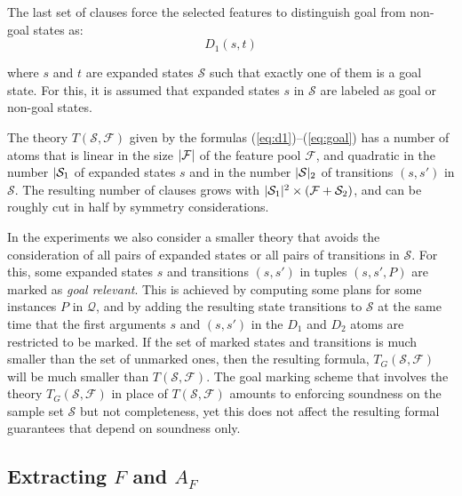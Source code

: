 \documentclass[letterpaper]{article} %
\newcommand{\Q}{\mathcal{Q}}
\newcommand{\F}{\mathcal{F}}
\renewcommand{\S}{\mathcal{S}}
\begin{document}
The last set of clauses force the selected features to distinguish goal
from non-goal states as:
\begin{equation}
  \label{eq:goal}
  D_1(s,t) 
\end{equation}

\noindent where  $s$ and $t$  are expanded states  $\S$ such that exactly one of them is a goal state. 
For this, it is assumed that expanded states $s$ in $\S$ are labeled as goal or non-goal states.

The theory $T(\S,\F)$ given by the formulas  (\ref{eq:d1})--(\ref{eq:goal})
has a number of atoms that is linear in the size $|{\cal F}|$  of the feature pool $\F$,
and quadratic in the number $|{\cal S}_1$ of expanded  states $s$  and
in the number $|{\cal S}|_2$ of transitions $(s,s')$ in $\S$.
The resulting number of clauses grows   with
$|{\cal S}_1|^2 \times ({\cal F} + {\cal S}_2)$, and 
can be roughly cut in half by  symmetry considerations.

In the experiments we also consider a smaller theory that avoids the
consideration of all pairs of expanded states or all pairs of transitions
in $\S$. For this, some expanded states $s$ and transitions $(s,s')$ in
tuples $(s,s',P)$ are marked as \emph{goal relevant}. This is achieved by
computing some plans for some instances $P$ in $\Q$, and by adding the
resulting state transitions to $\S$ at the same time that the first
arguments $s$ and $(s,s')$ in the $D_1$ and $D_2$ atoms are restricted
to be marked.
If the set of marked states and transitions is much smaller than the set of unmarked ones, 
then the resulting formula,  $T_G(\S,\F)$ will be much smaller than $T(\S,\F)$.
The goal marking scheme that involves the theory $T_G(\S,\F)$ in place of $T(\S,\F)$
amounts to enforcing soundness on  the sample set $\S$ but not completeness, yet this does
not affect the resulting  formal guarantees that depend on soundness only. 


\subsection{Extracting $F$ and  $A_F$}
\end{document}
